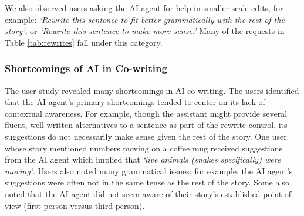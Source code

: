 We also observed users asking the AI agent for help in smaller scale edits, for example: \textit{`Rewrite this sentence to fit better grammatically with the rest of the story'}, or \textit{`Rewrite this sentence to make more sense.'} 
Many of the requests in Table \ref{tab:rewrites} fall under this category. 


\subsubsection{Shortcomings of AI in Co-writing}

The user study revealed many shortcomings in AI co-writing.
The users identified that the AI agent's primary shortcomings tended to center on its lack of contextual awareness. 
For example, though the assistant might provide several fluent, well-written alternatives to a sentence as part of the rewrite control, its suggestions do not necessarily make sense given the rest of the story. One user whose story mentioned numbers moving on a coffee mug received suggestions from the AI agent which implied that \textit{`live animals (snakes specifically) were moving'}.
Users also noted many grammatical issues; for example, the AI agent's suggestions were often not in the same tense as the rest of the story. Some also noted that the AI agent did not seem aware of their story's established point of view (first person versus third person). 




